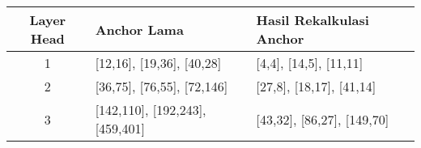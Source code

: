 \begin{table}[h]
  \centering
  \label{tbl:recalculated_anchor}
  \vspace{-1ex}
  \begin{tabular}{ c l l }
    \toprule[1.5pt]
    Layer Head & Anchor Lama        & Hasil Rekalkulasi Anchor\\
    \midrule
    1          & [12,16], [19,36], [40,28]& [4,4], [14,5], [11,11]\\
    2          & [36,75], [76,55], [72,146]& [27,8], [18,17], [41,14]\\
    3          & [142,110], [192,243], [459,401]& [43,32], [86,27], [149,70]\\
    \bottomrule[1.5pt]
  \end{tabular}
\end{table}